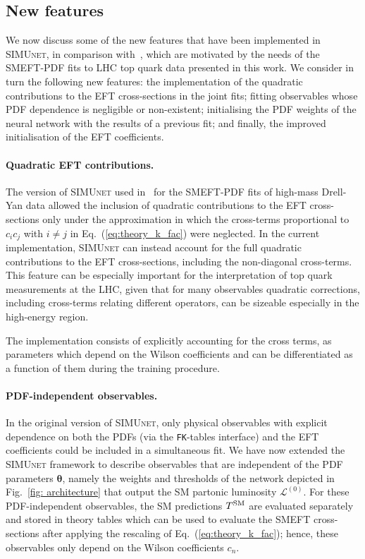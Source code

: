 \documentclass[withindex,glossary]{cam-thesis}
\newcommand{\simunet}{\textsc{SIMUnet}}
\begin{document}
\subsection{New features}
\label{sec:new_simunet}

We now discuss some of the new features that have been implemented in \simunet{}, in comparison
with~\cite{Iranipour:2022iak}, which are motivated by the needs of the SMEFT-PDF fits
to LHC top quark data presented in this work.
%
We consider in turn the following new features: the implementation of the quadratic contributions
to the EFT cross-sections in the joint fits; fitting observables whose PDF dependence
is negligible or non-existent; initialising the PDF weights of the neural network with the results
of a previous fit; and finally, the improved initialisation of the EFT
coefficients. 

\paragraph{Quadratic EFT contributions.}
%
The  version of \simunet{} used in~\cite{Iranipour:2022iak} for the SMEFT-PDF fits
of high-mass Drell-Yan data allowed the inclusion of quadratic contributions
to the EFT cross-sections only under the approximation in which the cross-terms proportional to $c_ic_j$
with $i\ne j$ in Eq.~(\ref{eq:theory_k_fac}) were neglected.
%
In the current implementation,  \simunet{} can instead account for the full quadratic
contributions to the EFT cross-sections, including the non-diagonal cross-terms.
%
This feature can be especially important for the interpretation of top quark
measurements at the LHC, given that for many observables quadratic corrections, including
cross-terms relating different operators, can be sizeable especially in the high-energy region.
%

The implementation consists of explicitly accounting for the cross terms, as
parameters which depend on the Wilson coefficients and can be differentiated as
a function of them during the training procedure. 

\paragraph{PDF-independent observables.}
%
In the original version of \simunet{}, only physical observables with explicit
dependence on both the PDFs (via the {\tt FK}-tables interface) and the EFT coefficients
  could be included in a simultaneous fit.
  We have now extended the \simunet{} framework
  to describe observables that are independent of the PDF parameters $\pmb{\theta}$,
  namely the weights and thresholds of the network depicted in Fig.~\ref{fig: architecture}
  that output the SM partonic luminosity $\mathcal{L}^{(0)}$.
  For these PDF-independent observables, the SM predictions $T^{\rm SM}$ are evaluated separately
  and stored in theory tables which can be used to evaluate the SMEFT cross-sections
  after applying the rescaling of Eq.~(\ref{eq:theory_k_fac});
  hence, these observables only depend on
the Wilson coefficients $c_n$.
\end{document}
